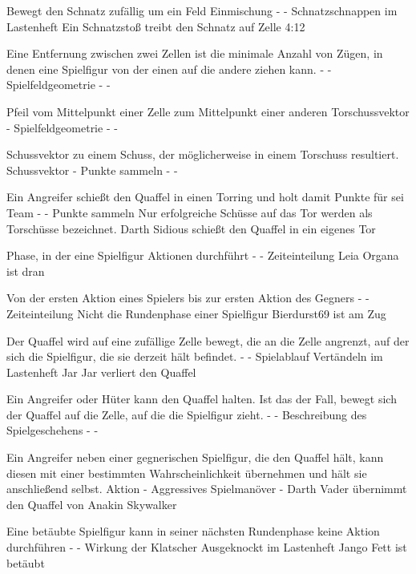 {Bewegt den Schnatz zufällig um ein Feld}
{Einmischung}
{-}
{-}
{\glqq{}Schnatzschnappen\grqq{}  im Lastenheft}
{Ein Schnatzstoß treibt den Schnatz auf Zelle 4:12}

{Eine Entfernung zwischen zwei Zellen ist die minimale Anzahl von Zügen, in denen eine Spielfigur von der einen auf die andere ziehen kann.}
{-}
{-}
{Spielfeldgeometrie}
{-}
{-}

{Pfeil vom Mittelpunkt einer Zelle zum Mittelpunkt einer anderen}
{Torschussvektor}
{-}
{Spielfeldgeometrie}
{-}
{-}

{Schussvektor zu einem Schuss, der möglicherweise in einem Torschuss resultiert.}
{Schussvektor}
{-}
{Punkte sammeln}
{-}
{-}

{Ein Angreifer schießt den Quaffel in einen Torring und holt damit Punkte für sei Team}
{-}
{-}
{Punkte sammeln}
{Nur erfolgreiche Schüsse auf das Tor werden als Torschüsse bezeichnet.}
{Darth Sidious schießt den Quaffel in ein eigenes Tor}

{Phase, in der eine Spielfigur Aktionen durchführt}
{-}
{-}
{Zeiteinteilung}
{}
{Leia Organa ist dran}

{Von der ersten Aktion eines Spielers bis zur ersten Aktion des Gegners}
{-}
{-}
{Zeiteinteilung}
{Nicht die Rundenphase einer Spielfigur}
{Bierdurst69 ist am Zug}

{Der Quaffel wird auf eine zufällige Zelle bewegt, die an die Zelle angrenzt, auf der sich die Spielfigur, die sie derzeit hält befindet.}
{-}
{-}
{Spielablauf}
{\glqq{}Vertändeln\grqq{}  im Lastenheft}
{Jar Jar verliert den Quaffel}

{Ein Angreifer oder Hüter kann den Quaffel halten. Ist das der Fall, bewegt sich der Quaffel auf die Zelle, auf die die Spielfigur zieht.}
{-}
{-}
{Beschreibung des Spielgeschehens}
{-}
{-}

{Ein Angreifer neben einer gegnerischen Spielfigur, die den Quaffel hält, kann diesen mit einer bestimmten Wahrscheinlichkeit übernehmen und hält sie anschließend selbst.}
{Aktion}
{-}
{Aggressives Spielmanöver}
{-}
{Darth Vader übernimmt den Quaffel von Anakin Skywalker}

{Eine betäubte Spielfigur kann in seiner nächsten Rundenphase keine Aktion durchführen}
{-}
{-}
{Wirkung der Klatscher}
{\glqq{}Ausgeknockt\grqq{}  im Lastenheft}
{Jango Fett ist betäubt}

